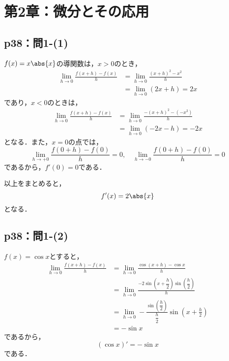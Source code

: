 \documentclass[uplatex,dvipdfmx,a4paper,10pt,fleqn]{jsarticle}
\begin{document}
\section*{第2章：微分とその応用}

\subsection*{p38：問1-(1)}

\begin{tleftbar}
    $f(x)=x \abs{x}$の導関数は，$x>0$のとき，
    \begin{align*} 
        \lim_{h \to 0} \frac{f(x+h)-f(x)}{h} & =\lim_{h \to 0} \frac{(x+h)^2-x^2}{h} \\
        & = \lim_{h \to 0} (2x+h) =2x 
    \end{align*} 
    であり，$x<0$のときは，
    \begin{align*} 
        \lim_{h \to 0} \frac{f(x+h)-f(x)}{h} & = \lim_{h \to 0} \frac{-(x+h)^2-(-x^2)}{h} \\
        & = \lim_{h \to 0} (-2x-h) =-2x 
    \end{align*} 
    となる．また，$x=0$の点では，
    \[
        \lim_{h \to +0} \frac{f(0+h)-f(0)}{h} =0, \quad  \lim_{h \to -0} \frac{f(0+h)-f(0)}{h} =0
    \]
    であるから，$f'(0)=0$である．

    以上をまとめると，
    \[
        f'(x)=2\abs{x}
    \]
    となる．
\end{tleftbar}

\newpage 


\subsection*{p38：問1-(2)}

\begin{tleftbar}
    $f(x)= \cos x$とすると，
    \begin{align*} 
        \lim_{h \to 0} \frac{f(x+h)-f(x)}{h} & =  \lim_{h \to 0}\frac{\cos (x+h)-\cos x}{h} \\
        & =  \lim_{h \to 0} \frac{ -2 \sin \left  (x+\dfrac{h}{2} \right ) \sin \left (\dfrac{h}{2} \right )}{h} \\
        & =  \lim_{h \to 0}- \frac{\sin \left (\dfrac{h}{2} \right )}{\dfrac{h}{2}} \sin \left (x+\frac{h}{2} \right) \\
        & = -\sin x 
    \end{align*}
        であるから，
        \[
            (\cos x)' = -\sin x
        \]
        である．
\end{tleftbar}
\end{document}
